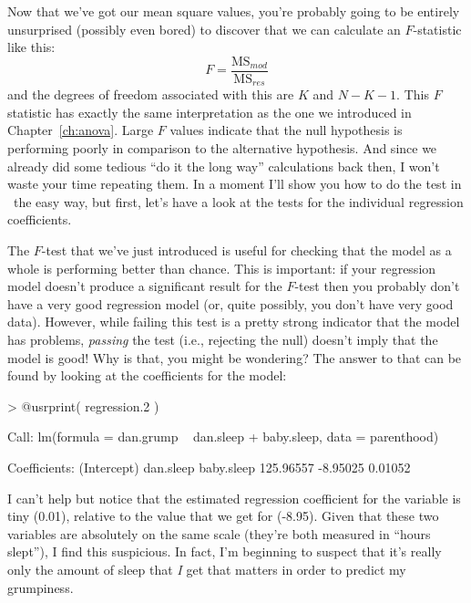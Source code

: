 Now that we've got our mean square values, you're probably going to be entirely unsurprised (possibly even bored) to discover that we can calculate an $F$-statistic like this:
$$
F =  \frac{\mbox{MS}_{mod}}{\mbox{MS}_{res}}
$$
and the degrees of freedom associated with this are $K$ and $N-K-1$. This $F$ statistic has exactly the same interpretation as the one we introduced in Chapter~\ref{ch:anova}. Large $F$ values indicate that the null hypothesis is performing poorly in comparison to the alternative hypothesis. And since we already did some tedious ``do it the long way'' calculations back then, I won't waste your time repeating them. In a moment I'll show you how to do the test in \R\ the easy way, but first, let's have a look at the tests for the individual regression coefficients.



The $F$-test that we've just introduced is useful for checking that the model as a whole is performing better than chance. This is important: if your regression model doesn't produce a significant result for the $F$-test then you probably don't have a very good regression model (or, quite possibly, you don't have very good data). However, while failing this test is a pretty strong indicator that the model has problems, {\it passing} the test (i.e., rejecting the null) doesn't imply that the model is good! Why is that, you might be wondering? The answer to that can be found by looking at the coefficients for the  model:
\begin{rblock1}
> @usr{print( regression.2 )}

Call:
lm(formula = dan.grump ~ dan.sleep + baby.sleep, data = parenthood)

Coefficients:
(Intercept)    dan.sleep   baby.sleep  
  125.96557     -8.95025      0.01052  
\end{rblock1}
I can't help but notice that the estimated regression coefficient for the  variable is tiny (0.01), relative to the value that we get for  (-8.95). Given that these two variables are absolutely on the same scale (they're both measured in ``hours slept''), I find this suspicious. In fact, I'm beginning to suspect that it's really only the amount of sleep that {\it I} get that matters in order to predict my grumpiness.

